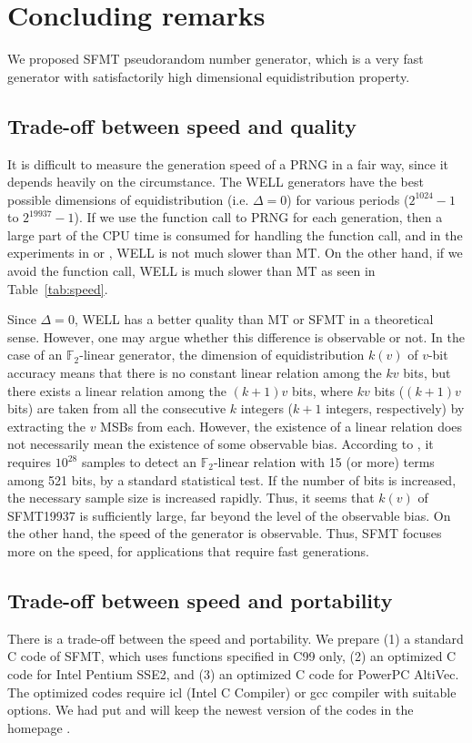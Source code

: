 \documentclass{svmult}
\def\F2{{\mathbb F}_2}
\begin{document}
\section{Concluding remarks}
We proposed SFMT pseudorandom number generator, 
which is a very fast generator with satisfactorily
high dimensional equidistribution property. 

\subsection{Trade-off between speed and quality}
It is difficult to measure the generation speed of a PRNG in a fair way,
since it depends heavily on the circumstance. 
The 
WELL \cite{WELL} generators have the best possible dimensions of 
equidistribution (i.e. $\Delta=0$)
for various periods ($2^{1024}-1$ to $2^{19937}-1$).
If we use the function call to PRNG
for each generation, then a large part of the CPU time
is consumed for handling the function call, and in the 
experiments in \cite{WELL} or \cite{XORSHIFT}, WELL 
is not much slower than MT. On the other hand, if we avoid
the function call, WELL is much slower than MT as seen
in Table~\ref{tab:speed}. 

Since $\Delta=0$, WELL has a better quality than MT or SFMT
in a theoretical sense. 
However, one may argue whether this difference is 
observable or not. In the case of an $\F2$-linear generator,
the dimension of equidistribution $k(v)$ of $v$-bit accuracy
means that
there is no constant linear relation among the 
$kv$ bits, but there exists a linear relation among
the $(k+1)v$ bits, where $kv$ bits 
($(k+1)v$ bits) are taken from
all the consecutive $k$ integers 
($k+1$ integers, respectively)
by extracting the $v$ MSBs from each.
However, the existence of a linear relation does not necessarily
mean the existence of some observable bias.
According to \cite{TESTWEIGHT}, it requires $10^{28}$
samples to detect an $\F2$-linear relation with 
15 (or more) terms among 521 bits, by a standard
statistical test. If the number of 
bits is increased, 
the necessary sample size is increased rapidly. Thus, it seems
that $k(v)$ of SFMT19937 is sufficiently large, far beyond
the level of the observable bias. 
On the other hand, the speed of the generator is 
observable.
Thus, SFMT focuses more on the speed, for applications
that require fast generations. 

\subsection{Trade-off between speed and portability}\label{sec:portability}
There is a trade-off between the speed and portability.
We prepare (1) a standard C code of SFMT, which uses 
functions specified in C99 only, (2) an optimized C code for
Intel Pentium SSE2, and 
(3) an optimized C code for PowerPC AltiVec. The optimized codes require
icl (Intel C Compiler) or gcc compiler with suitable options.
We had put and will keep the newest version of the codes 
in the homepage \cite{SFMT}.
\end{document}
